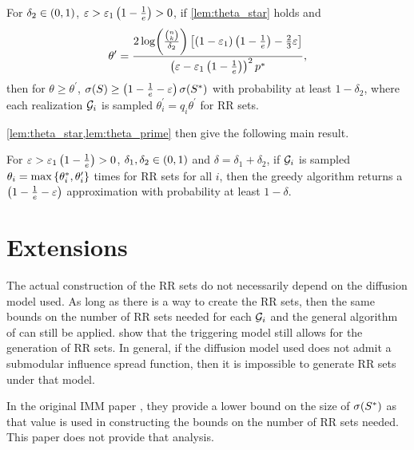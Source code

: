 \documentclass[11pt]{article}
\begin{document}
\begin{lemma}
    For $\delta_2 \in \lrp{0, 1}$, $\varepsilon > \varepsilon_1 \lrp{1 - \frac{1}{e}} > 0$, if \cref{lem:theta_star}
    holds and 
    \begin{equation}
        \theta^\prime = \frac{2 \f[\log]{\frac{\binom{n}{k}}{\delta_2}} \lrb{\lrp{1 - \varepsilon_1}\lrp{1 - \frac{1}{e}} - \frac{2}{3}\varepsilon}}{\lrp{\varepsilon - \varepsilon_1 \lrp{1 - \frac{1}{e}}}^2 p^*},
        \label{eq:theta_prime_i}
    \end{equation}
    then for $\theta \geq \theta^\prime$, $\f[\sigma]{S} \geq \lrp{1 - \frac{1}{e} - \varepsilon} \f[\sigma]{S^*}$
    with probability at least $1 - \delta_2$, where each realization $\calG_i$ is sampled $\theta_i^\prime = q_i \theta^\prime$ for RR sets. 
    \label{lem:theta_prime}
\end{lemma}

\cref{lem:theta_star,lem:theta_prime} then give the following main result. 

\begin{theorem}
    For $\varepsilon > \varepsilon_1 \lrp{1 - \frac{1}{e}} > 0$, $\delta_1 , \delta_2 \in \lrp{0, 1}$ and $\delta = \delta_1 + \delta_2$, 
    if $\calG_i$ is sampled $\theta_i = \max \lrc{\theta_i^{\ast}, \theta_i^\prime}$ times for RR sets for all $i$, 
    then the greedy algorithm returns a $\lrp{1 - \frac{1}{e} - \varepsilon}$ approximation with probability at least $1 - \delta$.     
    \label{thm:}
\end{theorem}

\section{Extensions}

The actual construction of the RR sets do not necessarily depend on the diffusion model used. As long as there is a way to 
create the RR sets, then the same bounds on the number of RR sets needed for each $\calG_i$ and the general algorithm of \cite{eshghi2019efficient} can still be applied. 
\cite{tang2015influence} show that the triggering model still allows for the generation of RR sets. In general, if the diffusion model used 
does not admit a submodular influence spread function, then it is impossible to generate RR sets under that model. 

In the original IMM paper \cite{tang2015influence}, they provide a lower bound on the size of $\f[\sigma]{S^*}$ as that value is used 
in constructing the bounds on the number of RR sets needed. This paper does not provide that analysis. 
\end{document}
